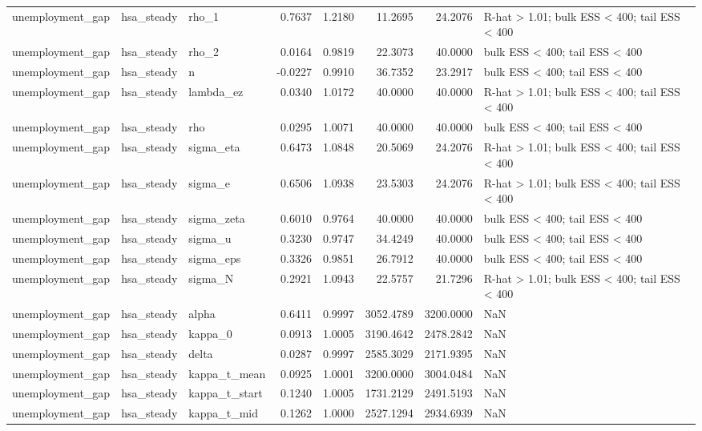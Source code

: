 \begin{tabular}{lllrrrrl}
unemployment\_gap & hsa\_steady & rho\_1 & 0.7637 & 1.2180 & 11.2695 & 24.2076 & R-hat > 1.01; bulk ESS < 400; tail ESS < 400 \\
unemployment\_gap & hsa\_steady & rho\_2 & 0.0164 & 0.9819 & 22.3073 & 40.0000 & bulk ESS < 400; tail ESS < 400 \\
unemployment\_gap & hsa\_steady & n & -0.0227 & 0.9910 & 36.7352 & 23.2917 & bulk ESS < 400; tail ESS < 400 \\
unemployment\_gap & hsa\_steady & lambda\_ez & 0.0340 & 1.0172 & 40.0000 & 40.0000 & R-hat > 1.01; bulk ESS < 400; tail ESS < 400 \\
unemployment\_gap & hsa\_steady & rho & 0.0295 & 1.0071 & 40.0000 & 40.0000 & bulk ESS < 400; tail ESS < 400 \\
unemployment\_gap & hsa\_steady & sigma\_eta & 0.6473 & 1.0848 & 20.5069 & 24.2076 & R-hat > 1.01; bulk ESS < 400; tail ESS < 400 \\
unemployment\_gap & hsa\_steady & sigma\_e & 0.6506 & 1.0938 & 23.5303 & 24.2076 & R-hat > 1.01; bulk ESS < 400; tail ESS < 400 \\
unemployment\_gap & hsa\_steady & sigma\_zeta & 0.6010 & 0.9764 & 40.0000 & 40.0000 & bulk ESS < 400; tail ESS < 400 \\
unemployment\_gap & hsa\_steady & sigma\_u & 0.3230 & 0.9747 & 34.4249 & 40.0000 & bulk ESS < 400; tail ESS < 400 \\
unemployment\_gap & hsa\_steady & sigma\_eps & 0.3326 & 0.9851 & 26.7912 & 40.0000 & bulk ESS < 400; tail ESS < 400 \\
unemployment\_gap & hsa\_steady & sigma\_N & 0.2921 & 1.0943 & 22.5757 & 21.7296 & R-hat > 1.01; bulk ESS < 400; tail ESS < 400 \\
unemployment\_gap & hsa\_steady & alpha & 0.6411 & 0.9997 & 3052.4789 & 3200.0000 & NaN \\
unemployment\_gap & hsa\_steady & kappa\_0 & 0.0913 & 1.0005 & 3190.4642 & 2478.2842 & NaN \\
unemployment\_gap & hsa\_steady & delta & 0.0287 & 0.9997 & 2585.3029 & 2171.9395 & NaN \\
unemployment\_gap & hsa\_steady & kappa\_t\_mean & 0.0925 & 1.0001 & 3200.0000 & 3004.0484 & NaN \\
unemployment\_gap & hsa\_steady & kappa\_t\_start & 0.1240 & 1.0005 & 1731.2129 & 2491.5193 & NaN \\
unemployment\_gap & hsa\_steady & kappa\_t\_mid & 0.1262 & 1.0000 & 2527.1294 & 2934.6939 & NaN \\

\end{tabular}
